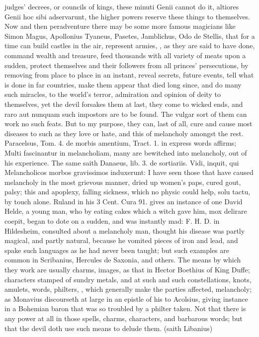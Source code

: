 {{judges' decrees, or councils of kings, these minuti Genii cannot do it,
altiores Genii hoc sibi adservarunt, the higher powers reserve these
things to themselves. Now and then peradventure there may be some more
famous magicians like Simon Magus, Apollonius Tyaneus, Pasetes,
Jamblichus, Odo de Stellis, that for a time can build castles in
the air, represent armies, \etc{}, as they are said to have done,
command wealth and treasure, feed thousands with all variety of meats
upon a sudden, protect themselves and their followers from all princes'
persecutions, by removing from place to place in an instant, reveal
secrets, future events, tell what is done in far countries, make them
appear that died long since, and do many such miracles, to the world's
terror, admiration and opinion of deity to themselves, yet the devil
forsakes them at last, they come to wicked ends, and raro aut nunquam
such impostors are to be found. The vulgar sort of them can work no
such feats. But to my purpose, they can, last of all, cure and cause
most diseases to such as they love or hate, and this of
melancholy amongst the rest. Paracelsus, Tom. 4. de morbis
amentium, Tract. 1. in express words affirms; Multi fascinantur in
melancholiam, many are bewitched into melancholy, out of his
experience. The same saith Danaeus, lib. 3. de sortiariis. Vidi,
inquit, qui Melancholicos morbos gravissimos induxerunt: I have seen
those that have caused melancholy in the most grievous manner,
dried up women's paps, cured gout, palsy; this and apoplexy,
falling sickness, which no physic could help, solu tactu, by touch
alone. Ruland in his 3 Cent. Cura 91. gives an instance of one David
Helde, a young man, who by eating cakes which a witch gave him, mox
delirare coepit, began to dote on a sudden, and was instantly mad: F.
H. D. in Hildesheim, consulted about a melancholy man, thought
his disease was partly magical, and partly natural, because he vomited
pieces of iron and lead, and spake such languages as he had never been
taught; but such examples are common in Scribanius, Hercules de
Saxonia, and others. The means by which they work are usually charms,
images, as that in Hector Boethius of King Duffe; characters stamped of
sundry metals, and at such and such constellations, knots, amulets,
words, philters, \etc{}, which generally make the parties affected,
melancholy; as Monavius discourseth at large in an epistle of his
to Acolsius, giving instance in a Bohemian baron that was so troubled
by a philter taken. Not that there is any power at all in those spells,
charms, characters, and barbarous words; but that the devil doth use
such means to delude them.  (saith Libanius)

}}
